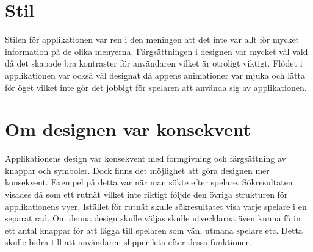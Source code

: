 \documentclass[11pt,a4paper]{article}
\begin{document}
\section{Stil}
Stilen för applikationen var ren i den meningen att det inte var allt för mycket information på de olika menyerna. Färgsättningen i designen var mycket väl vald då det skapade bra kontraster för användaren vilket är otroligt viktigt. Flödet i applikationen var också väl designat då appens animationer var mjuka och lätta för öget vilket inte gör det jobbigt för spelaren att använda sig av applikationen.

\section{Om designen var konsekvent}
Applikationens design var konsekvent med formgivning och färgsättning av knappar och symboler. Dock finns det möjlighet att göra designen mer konsekvent. Exempel på detta var när man sökte efter spelare. Sökresultaten visades då som ett rutnät vilket inte riktigt följde den övriga strukturen för applikationens vyer. Istället för rutnät skulle sökresultatet visa varje spelare i en separat rad. Om denna design skulle väljas skulle utvecklarna även kunna få in ett antal knappar för att lägga till spelaren som vän, utmana spelare etc. Detta skulle bidra till att användaren slipper leta efter dessa funktioner.
\end{document}
